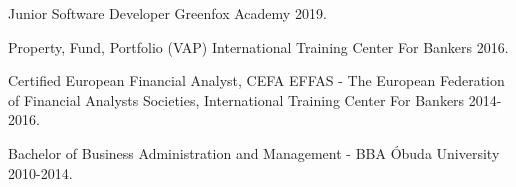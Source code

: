 

\begin{cventries}

   \cventry
    {Junior Software Developer} %
    {Greenfox Academy} %
    {} %
    {2019.} %
    {
    } 
  \vspace{-2.0mm}
  
  \cventry
    {Property, Fund, Portfolio (VAP)} %
    {International Training Center For Bankers} %
    {} %
    {2016.} %
    {
    }
  \vspace{-2.0mm}
  
  \cventry
    {Certified European Financial Analyst, CEFA} %
    {EFFAS - The European Federation of Financial Analysts Societies, International Training Center For Bankers} %
    {} %
    {2014-2016.} %
    {
    }
  \vspace{-2.0mm}

  \cventry
    {Bachelor of Business Administration and Management - BBA} %
    {Óbuda University} %
    {} %
    {2010-2014.} %
    {
    }
  \vspace{-2.0mm}


\end{cventries}
